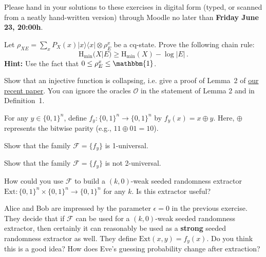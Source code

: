 \documentclass[a4paper,10pt,landscape,twocolumn]{scrartcl}
\newcommand{\ket}[1]{| #1 \rangle}
\newcommand{\bra}[1]{\langle #1 |}
\newcommand\deadline{Friday June 23, 20:00h}
\begin{document}
\newcommand{\Hmin}{\mathrm{H}_{\mathrm{min}}}

\homeworkproblems

{\sffamily\noindent
Please hand in your solutions to these exercises in digital form (typed, or scanned from a neatly hand-written version) through Moodle no later than \textbf{\deadline}.  %
}

\begin{exercise}
Let $\rho_{XE} = \sum_x P_X(x) \ket{x}\bra{x} \otimes \rho_E^x$ be a cq-state. Prove the following chain rule:
\[
\Hmin(X | E) \geq \Hmin(X) - \log |E| \, .
\]
\textbf{Hint: } Use the fact that $0 \leq \rho_E^x \leq \mathbbm{1}$.

\end{exercise}

\begin{exercise}
Show that an injective function is collapsing, i.e. give a proof of Lemma~2 of \href{http://homepages.cwi.nl/~schaffne/spool/sponges.pdf}{our recent paper}. You can ignore the oracles $\mathcal{O}$ in the statement of Lemma 2 and in Definition~1.
\end{exercise}

\begin{exercise}
	For any $y \in \{0,1\}^n$, define $f_y : \{0,1\}^n \to \{0,1\}^n$ by $f_y(x) = x \oplus y$. Here, $\oplus$ represents the bitwise parity (e.g., $11 \oplus 01 = 10$).
	\begin{subex}
		Show that the family $\mathscr{F} = \{f_y\}$ is 1-universal.
	\end{subex}
        \begin{subex}
          Show that the family $\mathscr{F} = \{f_y\}$ is not 2-universal.
        \end{subex}
        \begin{subex}
    	How could you use $\mathscr{F}$ to build a $(k,0)$-weak seeded randomness extractor $\text{Ext} : \{0,1\}^n \times \{0,1\}^n \to \{0,1\}^n$ for any $k$. Is this extractor useful?
    \end{subex}
    \begin{subex}
    	Alice and Bob are impressed by the parameter $\epsilon = 0$ in the previous exercise. They decide that if $\mathscr{F}$ can be used for a $(k,0)$-weak seeded randomness extractor, then certainly it can reasonably be used as a \textbf{strong} seeded randomness extractor as well. They define $\text{Ext}(x,y) = f_y(x)$. Do you think this is a good idea? How does Eve's guessing probability change after extraction?
    \end{subex}
\end{exercise}
\end{document}
